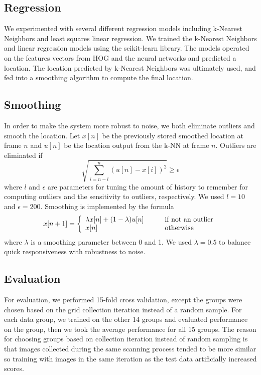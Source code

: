 \documentclass[10pt,twocolumn,letterpaper]{article}
\begin{document}
\subsection{Regression}
We experimented with several different regression models including k-Nearest Neighbors and least squares linear regression.  We trained the k-Nearest Neighbors and linear regression models using the scikit-learn library\cite{scikit-learn}.  The models operated on the features vectors from HOG and the neural networks and predicted a location. The location predicted by k-Nearest Neighbors was ultimately used, and fed into a smoothing algorithm to compute the final location.

\subsection{Smoothing}
In order to make the system more robust to noise, we both eliminate outliers and smooth the location. Let $x[n]$ be the previously stored smoothed location at frame $n$ and $u[n]$ be the location output from the k-NN at frame $n$. Outliers are eliminated if
\begin{equation}
	\sqrt{\sum_{i=n-l}^{n}(u[n]-x[i])^2} \geq \epsilon
\end{equation}
where $l$ and $\epsilon$ are parameters for tuning the amount of history to remember for computing outliers and the sensitivity to outliers, respectively. We used $l=10$ and $\epsilon=200$. Smoothing is implemented by the formula 
\begin{equation}
	x[n+1] = \left\{
		\begin{array}{l l}
			\lambda x[n] + (1-\lambda)u[n] & \qquad \text{if not an outlier} \\
			x[n] & \qquad \text{otherwise}
		\end{array}
	\right.
\end{equation}
 where $\lambda$ is a smoothing parameter between 0 and 1. We used $\lambda=0.5$ to balance quick responsiveness with robustness to noise.
 
\subsection{Evaluation}
For evaluation, we performed 15-fold cross validation, except the groups were chosen based on the grid collection iteration instead of a random sample.  For each data group, we trained on the other 14 groups and evaluated performance on the group, then we took the average performance for all 15 groups.  The reason for choosing groups based on collection iteration instead of random sampling is that images collected during the same scanning process tended to be more similar so training with images in the same iteration as the test data artificially increased scores.
\end{document}

